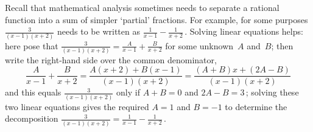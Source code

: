 \begin{example} \label{eg:}
Recall that mathematical analysis sometimes needs to separate a rational function into a sum of simpler `partial' fractions.  
For example, for some purposes\(\frac3{(x-1)(x+2)}\) needs to be written as \(\frac1{x-1}-\frac1{x+2}\)\,.  
Solving linear equations helps: here  pose that \(\frac3{(x-1)(x+2)} = \frac A{x-1}+\frac B{x+2}\) for some unknown~\(A\) and~\(B\); then write the right-hand side over the common denominator,
\begin{equation*}
\frac A{x-1}+\frac B{x+2}
=\frac{A(x+2)+B(x-1)}{(x-1)(x+2)}
=\frac{(A+B)x+(2A-B)}{(x-1)(x+2)}
\end{equation*}
and this equals \(\frac3{(x-1)(x+2)}\) only if \(A+B=0\) and \(2A-B=3\)\,; solving these two linear equations gives the required \(A=1\) and \(B=-1\) to determine the decomposition \(\frac3{(x-1)(x+2)}=\frac1{x-1}-\frac1{x+2}\)\,.


\end{example}
